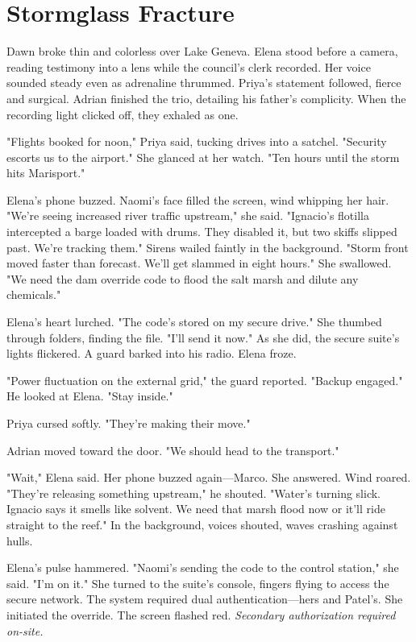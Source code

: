 \chapter{Stormglass Fracture}

Dawn broke thin and colorless over Lake Geneva. Elena stood before a camera, reading testimony into a lens while the council's clerk recorded. Her voice sounded steady even as adrenaline thrummed. Priya's statement followed, fierce and surgical. Adrian finished the trio, detailing his father's complicity. When the recording light clicked off, they exhaled as one.

"Flights booked for noon," Priya said, tucking drives into a satchel. "Security escorts us to the airport." She glanced at her watch. "Ten hours until the storm hits Marisport."

Elena's phone buzzed. Naomi's face filled the screen, wind whipping her hair. "We're seeing increased river traffic upstream," she said. "Ignacio's flotilla intercepted a barge loaded with drums. They disabled it, but two skiffs slipped past. We're tracking them." Sirens wailed faintly in the background. "Storm front moved faster than forecast. We'll get slammed in eight hours." She swallowed. "We need the dam override code to flood the salt marsh and dilute any chemicals."

Elena's heart lurched. "The code's stored on my secure drive." She thumbed through folders, finding the file. "I'll send it now." As she did, the secure suite's lights flickered. A guard barked into his radio. Elena froze.

"Power fluctuation on the external grid," the guard reported. "Backup engaged." He looked at Elena. "Stay inside."

Priya cursed softly. "They're making their move."

Adrian moved toward the door. "We should head to the transport."

"Wait," Elena said. Her phone buzzed again—Marco. She answered. Wind roared. "They're releasing something upstream," he shouted. "Water's turning slick. Ignacio says it smells like solvent. We need that marsh flood now or it'll ride straight to the reef." In the background, voices shouted, waves crashing against hulls.

Elena's pulse hammered. "Naomi's sending the code to the control station," she said. "I'm on it." She turned to the suite's console, fingers flying to access the secure network. The system required dual authentication—hers and Patel's. She initiated the override. The screen flashed red. \textit{Secondary authorization required on-site.}

